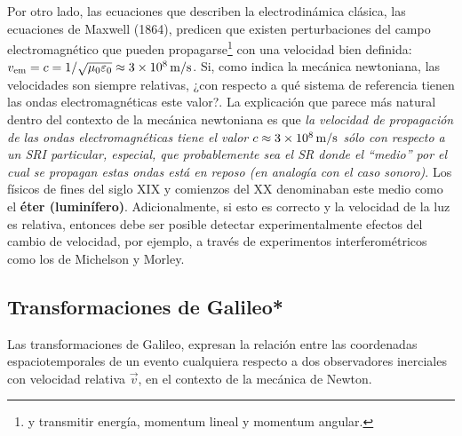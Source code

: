 Por otro lado, las ecuaciones que describen la electrodinámica clásica,  las ecuaciones de Maxwell (1864), predicen que existen perturbaciones del campo electromagnético que pueden propagarse\footnote{y transmitir energía, momentum lineal y momentum angular.} con una velocidad bien definida: $v_{\rm em}=c ={1}/{\sqrt{\mu_0\varepsilon_0}}\approx 3\times 10^{8}\,\rm m/s$. Si, como indica la mecánica newtoniana, las velocidades son siempre relativas, ¿con respecto a qué sistema de referencia tienen las ondas electromagnéticas este valor?. La explicación que parece más natural dentro del contexto de la mecánica newtoniana es que \textit{la velocidad de
propagación de las ondas electromagnéticas tiene el valor $c\approx 3\times 10^{8}\,\rm m/s$ sólo con respecto a un SRI particular, especial, que probablemente sea el SR donde el ``medio'' por el cual se propagan estas ondas está en reposo (en analogía con el caso sonoro)}. Los físicos de fines del siglo XIX y comienzos del XX denominaban este medio como el \textbf{éter  (luminífero)}. Adicionalmente, si esto es correcto y la velocidad de la luz es relativa, entonces debe ser posible detectar experimentalmente efectos del cambio de velocidad, por ejemplo, a través de experimentos interferométricos como los de Michelson y Morley.

\subsection{Transformaciones de Galileo*}
Las transformaciones de Galileo, expresan la relación entre las coordenadas espaciotemporales de un evento cualquiera respecto a dos observadores inerciales con velocidad relativa $\vec{v}$, en el contexto de la mecánica de Newton.

